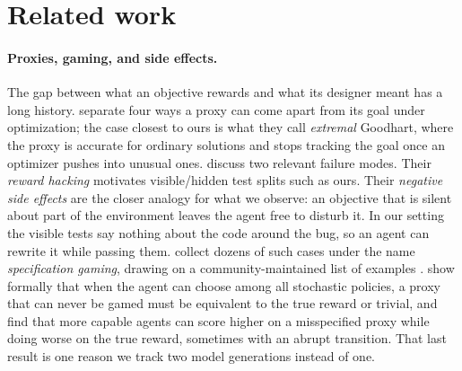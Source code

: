 \section{Related work}
\label{sec:related}

\paragraph{Proxies, gaming, and side effects.}
The gap between what an objective rewards and what its designer meant has a
long history. \citet{manheim2018categorizing} separate four ways a proxy can
come apart from its goal under optimization; the case closest to ours is what
they call \emph{extremal} Goodhart, where the proxy is accurate for ordinary
solutions and stops tracking the goal once an optimizer pushes into unusual
ones. \citet{amodei2016concrete} discuss two relevant failure modes. Their
\emph{reward hacking} motivates visible/hidden test splits such as ours.
Their \emph{negative side effects} are the closer analogy for what we
observe: an objective that is silent about part of the environment leaves the
agent free to disturb it. In our setting the visible tests say
nothing about the code around the bug, so an agent can rewrite it while
passing them.
\citet{krakovna2020specification} collect dozens of such cases under the name
\emph{specification gaming}, drawing on a community-maintained list of
examples \citep{krakovna2018specificationexamples}. \citet{skalse2022defining} show formally that
when the agent can choose among all stochastic policies, a proxy that can
never be gamed must be equivalent to the true reward or trivial, and \citet{pan2022effects} find that more capable agents can score
higher on a misspecified proxy while doing worse on the true reward, sometimes
with an abrupt transition. That last result is one reason we track two model
generations instead of one.

